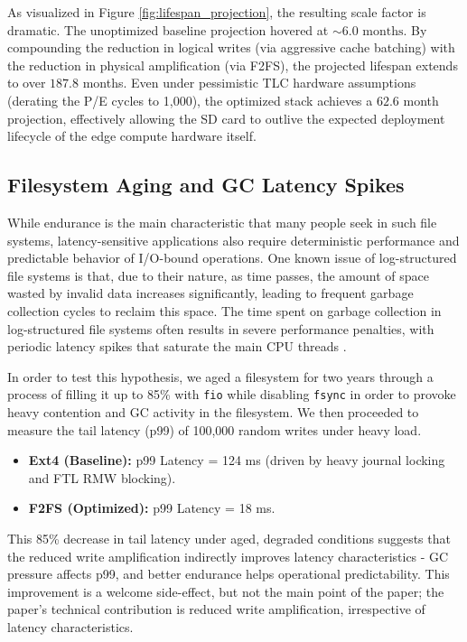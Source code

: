 \documentclass[conference]{IEEEtran}
\begin{document}
As visualized in Figure \ref{fig:lifespan_projection}, the resulting scale factor is dramatic. The unoptimized baseline projection hovered at $\sim 6.0 \text{ months}$. By compounding the reduction in logical writes (via aggressive cache batching) with the reduction in physical amplification (via F2FS), the projected lifespan extends to over $187.8$ months. Even under pessimistic TLC hardware assumptions (derating the P/E cycles to 1,000), the optimized stack achieves a $62.6$ month projection, effectively allowing the SD card to outlive the expected deployment lifecycle of the edge compute hardware itself.

\subsection{Filesystem Aging and GC Latency Spikes}
While endurance is the main characteristic that many people seek in such file systems, latency-sensitive applications also require deterministic performance and predictable behavior of I/O-bound operations. One known issue of log-structured file systems is that, due to their nature, as time passes, the amount of space wasted by invalid data increases significantly, leading to frequent garbage collection cycles to reclaim this space. The time spent on garbage collection in log-structured file systems often results in severe performance penalties, with periodic latency spikes that saturate the main CPU threads \cite{b28}.

In order to test this hypothesis, we aged a filesystem for two years through a process of filling it up to 85\% with \texttt{fio} while disabling \texttt{fsync} in order to provoke heavy contention and GC activity in the filesystem. We then proceeded to measure the tail latency (p99) of 100,000 random writes under heavy load.

\begin{itemize}
    \item \textbf{Ext4 (Baseline):} p99 Latency = 124 ms (driven by heavy journal locking and FTL RMW blocking).
    \item \textbf{F2FS (Optimized):} p99 Latency = 18 ms.
\end{itemize}

This 85\% decrease in tail latency under aged, degraded conditions suggests that the reduced write amplification indirectly improves latency characteristics - GC pressure affects p99, and better endurance helps operational predictability. This improvement is a welcome side-effect, but not the main point of the paper; the paper’s technical contribution is reduced write amplification, irrespective of latency characteristics.
\end{document}
